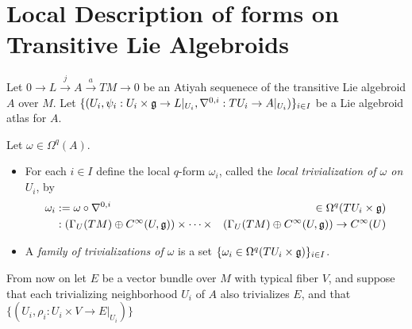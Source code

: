 \section{Local Description of forms on Transitive Lie Algebroids}

Let $0 \to L \xrightarrow{j} A \xrightarrow{a} TM \to 0$ be an Atiyah sequenece of the transitive Lie algebroid $A$ over $M$. Let $\{(U_i, \psi_i: U_i \times \mathfrak{g} \to L|_{U_i}, \nabla^{0, i}: TU_i \to A|_{U_i})\}_{i \in I}$ be a Lie algebroid atlas for $A$.

\begin{definition}\label{definitionLocalTrivializationOfScalarValuedForms}
Let $\omega \in \Omega^q(A)$.
    \begin{itemize}
    
    \item For each $i \in I$ define the local $q$-form $\omega_i$, called the \emph{local trivialization of $\omega$ on $U_i$}, by
    \begin{align}
        \omega_i &:= \omega \circ \nabla^{0, i}  & \in \Omega^q(TU_i\times \mathfrak{g})\\
        &:\left( \Gamma_U(TM)\oplus C^\infty(U, \mathfrak{g}) \right) \times \cdots \times &\left( \Gamma_U(TM)\oplus C^\infty(U, \mathfrak{g}) \right) \to C^\infty(U)
    \end{align}
    
    \item A \emph{family of trivializations of $\omega$} is a set $\{\omega_i \in \Omega^q(TU_i \times \mathfrak{g})\}_{i \in I}$.
    
    \end{itemize}

\end{definition}

From now on let $E$ be a vector bundle over $M$ with typical fiber $V$, and suppose that each trivializing neighborhood $U_i$ of $A$ also trivializes $E$, and that $\{(U_i, \rho_i: U_i \times V \to E|_{U_i})\}$

